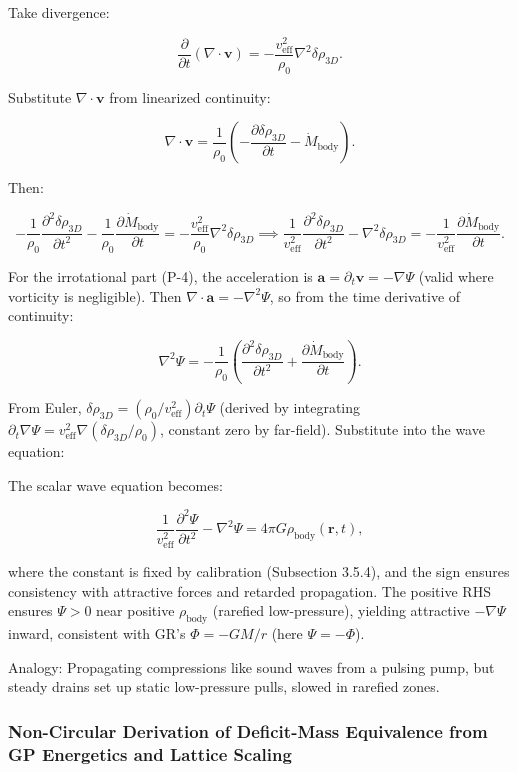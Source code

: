Take divergence:

\[
\frac{\partial}{\partial t} (\nabla \cdot \mathbf{v}) = -\frac{v_{\text{eff}}^2}{\rho_0} \nabla^2 \delta \rho_{3D}.
\]

Substitute $\nabla \cdot \mathbf{v}$ from linearized continuity:

\[
\nabla \cdot \mathbf{v} = \frac{1}{\rho_0} \left( -\frac{\partial \delta \rho_{3D}}{\partial t} - \dot{M}_{\text{body}} \right).
\]

Then:

\[
-\frac{1}{\rho_0} \frac{\partial^2 \delta \rho_{3D}}{\partial t^2} - \frac{1}{\rho_0} \frac{\partial \dot{M}_{\text{body}}}{\partial t} = -\frac{v_{\text{eff}}^2}{\rho_0} \nabla^2 \delta \rho_{3D} \implies \frac{1}{v_{\text{eff}}^2} \frac{\partial^2 \delta \rho_{3D}}{\partial t^2} - \nabla^2 \delta \rho_{3D} = -\frac{1}{v_{\text{eff}}^2} \frac{\partial \dot{M}_{\text{body}}}{\partial t}.
\]

For the irrotational part (P-4), the acceleration is $\mathbf{a} = \partial_t \mathbf{v} = -\nabla \Psi$ (valid where vorticity is negligible). Then $\nabla \cdot \mathbf{a} = -\nabla^2 \Psi$, so from the time derivative of continuity:

\[
\nabla^2 \Psi = -\frac{1}{\rho_0} \left( \frac{\partial^2 \delta \rho_{3D}}{\partial t^2} + \frac{\partial \dot{M}_{\text{body}}}{\partial t} \right).
\]

From Euler, $\delta \rho_{3D} = (\rho_0 / v_{\text{eff}}^2) \partial_t \Psi$ (derived by integrating $\partial_t \nabla \Psi = v_{\text{eff}}^2 \nabla (\delta \rho_{3D} / \rho_0)$, constant zero by far-field). Substitute into the wave equation:

The scalar wave equation becomes:

\[
\frac{1}{v_{\text{eff}}^2} \frac{\partial^2 \Psi}{\partial t^2} - \nabla^2 \Psi = 4\pi G \rho_{\text{body}}(\mathbf{r}, t),
\]

where the constant is fixed by calibration (Subsection 3.5.4), and the sign ensures consistency with attractive forces and retarded propagation. The positive RHS ensures $\Psi > 0$ near positive $\rho_{\text{body}}$ (rarefied low-pressure), yielding attractive $-\nabla \Psi$ inward, consistent with GR's $\Phi = -GM/r$ (here $\Psi = -\Phi$).

Analogy: Propagating compressions like sound waves from a pulsing pump, but steady drains set up static low-pressure pulls, slowed in rarefied zones.

\subsubsection{Non-Circular Derivation of Deficit-Mass Equivalence from GP Energetics and Lattice Scaling}


